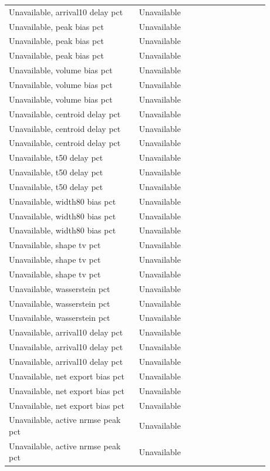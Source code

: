 \begin{longtable}{p{0.4400\linewidth}p{0.4400\linewidth}}
Unavailable, arrival10 delay pct & Unavailable \\
Unavailable, peak bias pct & Unavailable \\
Unavailable, peak bias pct & Unavailable \\
Unavailable, peak bias pct & Unavailable \\
Unavailable, volume bias pct & Unavailable \\
Unavailable, volume bias pct & Unavailable \\
Unavailable, volume bias pct & Unavailable \\
Unavailable, centroid delay pct & Unavailable \\
Unavailable, centroid delay pct & Unavailable \\
Unavailable, centroid delay pct & Unavailable \\
Unavailable, t50 delay pct & Unavailable \\
Unavailable, t50 delay pct & Unavailable \\
Unavailable, t50 delay pct & Unavailable \\
Unavailable, width80 bias pct & Unavailable \\
Unavailable, width80 bias pct & Unavailable \\
Unavailable, width80 bias pct & Unavailable \\
Unavailable, shape tv pct & Unavailable \\
Unavailable, shape tv pct & Unavailable \\
Unavailable, shape tv pct & Unavailable \\
Unavailable, wasserstein pct & Unavailable \\
Unavailable, wasserstein pct & Unavailable \\
Unavailable, wasserstein pct & Unavailable \\
Unavailable, arrival10 delay pct & Unavailable \\
Unavailable, arrival10 delay pct & Unavailable \\
Unavailable, arrival10 delay pct & Unavailable \\
Unavailable, net export bias pct & Unavailable \\
Unavailable, net export bias pct & Unavailable \\
Unavailable, net export bias pct & Unavailable \\
Unavailable, active nrmse peak pct & Unavailable \\
Unavailable, active nrmse peak pct & Unavailable \\

\end{longtable}
